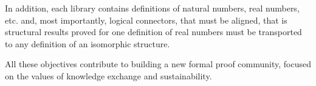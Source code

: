 In addition, each library contains definitions of natural numbers,
real numbers, etc. and, most importantly, logical connectors, that
must be aligned, that is structural results proved for one definition
of real numbers must be transported to any definition of an isomorphic
structure.

All these objectives contribute to building a new formal proof
community, focused on the values of knowledge exchange and
sustainability.


